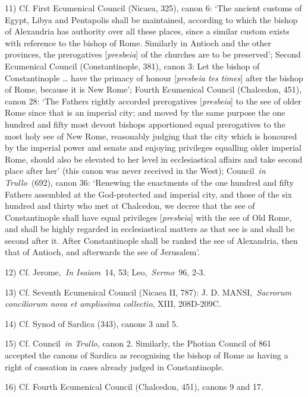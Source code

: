 11) Cf. First Ecumenical Council (Nicaea, 325), canon 6: `The ancient
customs of Egypt, Libya and Pentapolis shall be maintained, according to
which the bishop of Alexandria has authority over all these places,
since a similar custom exists with reference to the bishop of Rome.
Similarly in Antioch and the other provinces, the prerogatives
{[}\emph{presbeia}{]} of the churches are to be preserved'; Second
Ecumenical Council (Constantinople, 381), canon 3: Let the bishop of
Constantinople \ldots{} have the primacy of honour {[}\emph{presbeia tes
times}{]} after the bishop of Rome, because it is New Rome'; Fourth
Ecumenical Council (Chalcedon, 451), canon 28: `The Fathers rightly
accorded prerogatives {[}\emph{presbeia}{]} to the see of older Rome
since that is an imperial city; and moved by the same purpose the one
hundred and fifty most devout bishops apportioned equal prerogatives to
the most holy see of New Rome, reasonably judging that the city which is
honoured by the imperial power and senate and enjoying privileges
equalling older imperial Rome, should also be elevated to her level in
ecclesiastical affairs and take second place after her' (this canon was
never received in the West); Council~\emph{in Trullo~}(692), canon 36:
`Renewing the enactments of the one hundred and fifty Fathers assembled
at the God-protected and imperial city, and those of the six hundred and
thirty who met at Chalcedon, we decree that the see of Constantinople
shall have equal privileges {[}\emph{presbeia}{]} with the see of Old
Rome, and shall be highly regarded in ecclesiastical matters as that see
is and shall be second after it. After Constantinople shall be ranked
the see of Alexandria, then that of Antioch, and afterwards the see of
Jerusalem'.

12) Cf. Jerome,~\emph{In Isaiam~}14, 53; Leo,~\emph{Sermo~}96, 2-3.

13) Cf. Seventh Ecumenical Council (Nicaea II, 787): J. D.
MANSI,~\emph{Sacrorum conciliorum nova et amplissima collectio}, XIII,
208D-209C.

14) Cf. Synod of Sardica (343), canons 3 and 5.

15) Cf. Council~\emph{in Trullo}, canon 2. Similarly, the Photian
Council of 861 accepted the canons of Sardica as recognising the bishop
of Rome as having a right of cassation in cases already judged in
Constantinople.

16) Cf. Fourth Ecumenical Council (Chalcedon, 451), canons 9 and 17.
